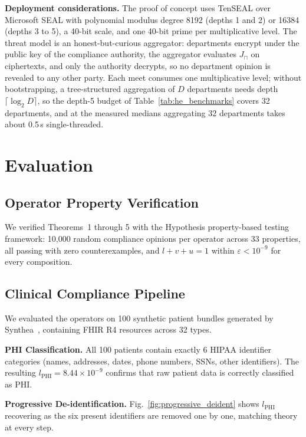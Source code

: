 \documentclass[conference]{IEEEtran}
\begin{document}
\textbf{Deployment considerations.} The proof of concept uses TenSEAL over Microsoft SEAL with polynomial modulus degree 8192 (depths 1 and 2) or 16384 (depths 3 to 5), a 40-bit scale, and one 40-bit prime per multiplicative level. The threat model is an honest-but-curious aggregator: departments encrypt under the public key of the compliance authority, the aggregator evaluates $J_\sqcap$ on ciphertexts, and only the authority decrypts, so no department opinion is revealed to any other party. Each meet consumes one multiplicative level; without bootstrapping, a tree-structured aggregation of $D$ departments needs depth $\lceil \log_2 D \rceil$, so the depth-5 budget of Table~\ref{tab:he_benchmarks} covers 32 departments, and at the measured medians aggregating 32 departments takes about 0.5\,s single-threaded.

\section{Evaluation}

\subsection{Operator Property Verification}

We verified Theorems~1 through 5 with the Hypothesis property-based testing framework: 10,000 random compliance opinions per operator across 33 properties, all passing with zero counterexamples, and $l + v + u = 1$ within $\varepsilon < 10^{-9}$ for every composition.

\subsection{Clinical Compliance Pipeline}

We evaluated the operators on 100 synthetic patient bundles generated by Synthea~\cite{walonoski2018synthea}, containing FHIR R4 resources across 32 types.

\textbf{PHI Classification.} All 100 patients contain exactly 6 HIPAA identifier categories (names, addresses, dates, phone numbers, SSNs, other identifiers). The resulting $l_{\text{PHI}} = 8.44 \times 10^{-9}$ confirms that raw patient data is correctly classified as PHI.

\textbf{Progressive De-identification.} Fig.~\ref{fig:progressive_deident} shows $l_{\text{PHI}}$ recovering as the six present identifiers are removed one by one, matching theory at every step.
\end{document}
